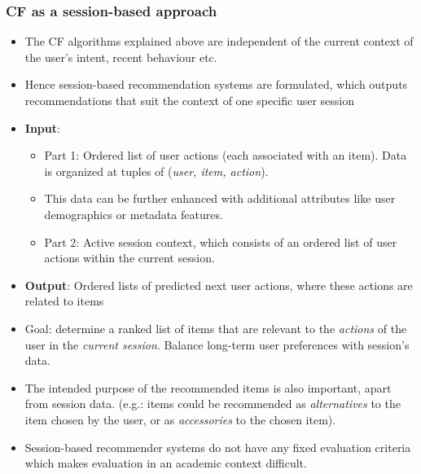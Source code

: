 \documentclass{article}
\begin{document}
\subsubsection{CF as a session-based approach}
\begin{itemize}
    \item The CF algorithms explained above are independent of the current context of the user's intent, recent behaviour etc.
    
    \item Hence session-based recommendation systems are formulated, which outputs recommendations that suit the context of one specific user session
    
    \item \textbf{Input}: 
    \begin{itemize}
        \item Part 1: Ordered list of user actions (each associated with an item). Data is organized at tuples of (\textit{user, item, action}). 
    
        \item This data can be further enhanced with additional attributes like user demographics or metadata features. 
        
        \item Part 2: Active session context, which consists of an ordered list of user actions within the current session. 
    \end{itemize}
    
    \item \textbf{Output}: Ordered lists of predicted next user actions, where these actions are related to items
    
    \item Goal: determine a ranked list of items that are relevant to the \textit{actions} of the user in the \textit{current session}. Balance long-term user preferences with session's data. 
    
    \item The intended purpose of the recommended items is also important, apart from session data. (e.g.: items could be recommended as \textit{alternatives} to the item chosen by the user, or as \textit{accessories} to the chosen item).
    
    \item Session-based recommender systems do not have any fixed evaluation criteria which makes evaluation in an academic context difficult. 
\end{itemize}
\end{document}
